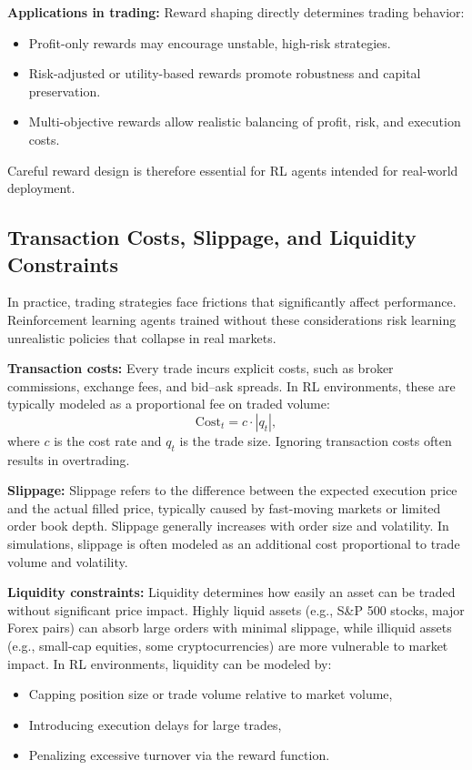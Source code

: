 \documentclass[12pt,a4paper]{report}
\begin{document}
\bigskip
\textbf{Applications in trading:}  
Reward shaping directly determines trading behavior:
\begin{itemize}
    \item Profit-only rewards may encourage unstable, high-risk strategies.
    \item Risk-adjusted or utility-based rewards promote robustness and capital preservation.
    \item Multi-objective rewards allow realistic balancing of profit, risk, and execution costs.
\end{itemize}
Careful reward design is therefore essential for RL agents intended for real-world deployment.

\subsection{Transaction Costs, Slippage, and Liquidity Constraints}

In practice, trading strategies face frictions that significantly affect performance. Reinforcement learning agents trained without these considerations risk learning unrealistic policies that collapse in real markets.

\bigskip
\textbf{Transaction costs:}  
Every trade incurs explicit costs, such as broker commissions, exchange fees, and bid–ask spreads. In RL environments, these are typically modeled as a proportional fee on traded volume:
\[
\text{Cost}_t = c \cdot |q_t|,
\]
where $c$ is the cost rate and $q_t$ is the trade size. Ignoring transaction costs often results in overtrading.

\bigskip
\textbf{Slippage:}  
Slippage refers to the difference between the expected execution price and the actual filled price, typically caused by fast-moving markets or limited order book depth. Slippage generally increases with order size and volatility.  
In simulations, slippage is often modeled as an additional cost proportional to trade volume and volatility.

\bigskip
\textbf{Liquidity constraints:}  
Liquidity determines how easily an asset can be traded without significant price impact. Highly liquid assets (e.g., S\&P 500 stocks, major Forex pairs) can absorb large orders with minimal slippage, while illiquid assets (e.g., small-cap equities, some cryptocurrencies) are more vulnerable to market impact.  
In RL environments, liquidity can be modeled by:
\begin{itemize}
    \item Capping position size or trade volume relative to market volume,
    \item Introducing execution delays for large trades,
    \item Penalizing excessive turnover via the reward function.
\end{itemize}
\end{document}
